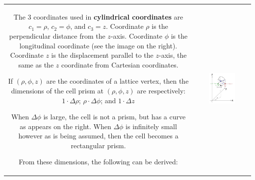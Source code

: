 \documentclass{book}
\begin{document}
\begin{tabular}{cc}
\parbox{0.5\textwidth}{
The 3 coordinates used in {\bf cylindrical coordinates} are \(c_1 = \rho\), \(c_2 = \phi\), and \(c_3 = z\). Coordinate \(\rho\) is the perpendicular distance from the \(z\)-axis. Coordinate \(\phi\) is the longitudinal coordinate (see the image on the right). Coordinate \(z\) is the displacement parallel to the \(z\)-axis, the same as the \(z\) coordinate from Cartesian coordinates. 

If \((\rho,\phi,z)\) are the coordinates of a lattice vertex, then the dimensions of the cell prism at \((\rho,\phi,z)\) are respectively:
\(1 \cdot \Delta\rho\); \(\rho \cdot \Delta\phi\); and \(1 \cdot \Delta z\)

When \(\Delta\phi\) is large, the cell is not a prism, but has a curve as appears on the right. When \(\Delta\phi\) is infinitely small however as is being assumed, then the cell becomes a rectangular prism.

From these dimensions, the following can be derived:
} & \parbox{0.5\textwidth}{
\includegraphics[width = 0.5\textwidth]{Coordinate_systems/cylindrical_coordinates}
}
\end{tabular}
\end{document}
